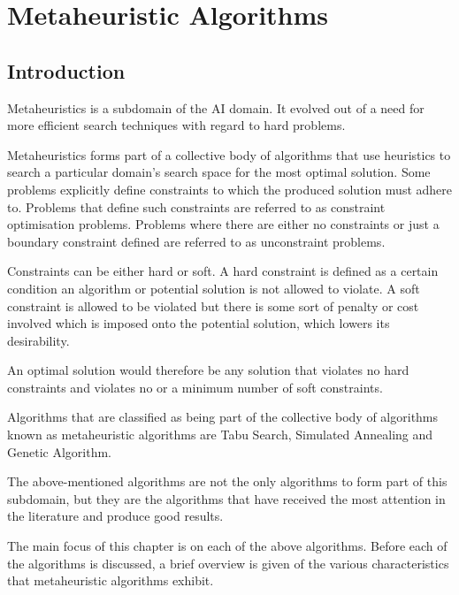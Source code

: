 \chapter{Metaheuristic Algorithms}
\label{chpt:heuristic}
\section{Introduction}
Metaheuristics is a subdomain of the \gls{AI} domain\cite{AIModernApproach}. It evolved out of a need for more efficient search techniques with regard to hard problems. 

Metaheuristics forms part of a collective body of algorithms that use heuristics to search a particular domain's search space for the most optimal solution\cite{AIModernApproach,NatureInspiredMetaHeuristic}. Some problems explicitly define constraints to which the produced solution must adhere to. Problems that define such constraints are referred to as constraint optimisation problems\cite{FundamentalSwarm}. Problems where there are either no constraints or just a boundary constraint  defined are referred to as unconstraint problems\cite{FundamentalSwarm}.

Constraints can be either hard or soft. A hard constraint is defined as a certain condition an algorithm or potential solution is not allowed to violate\cite{AIModernApproach,NatureInspiredMetaHeuristic,Karen2004,Eisenblatter}. A soft constraint is allowed to be violated but there is some sort of penalty or cost involved which is imposed onto the potential solution, which lowers its desirability\cite{AIModernApproach,NatureInspiredMetaHeuristic,Karen2004,Eisenblatter}. 

An optimal solution would therefore be any solution that violates no hard constraints and violates no or a minimum number of soft constraints\cite{AIModernApproach,NatureInspiredMetaHeuristic,Karen2004,Eisenblatter}.

Algorithms that are classified as being part of the collective body of algorithms known as metaheuristic algorithms are Tabu Search\cite{TabuVechicleRoutingWithTimeWindows,TabuCSP}, Simulated Annealing \cite{SASingleMultiObj,CurveFittingSA} and Genetic Algorithm\cite{GATSP, GeostatisticalGA}.

The above-mentioned algorithms are not the only algorithms to form part of this subdomain, but they are the algorithms that have received the most attention in the literature and produce good results\cite{SweepMeta}.

The main focus of this chapter is on each of the above algorithms. Before each of the algorithms is discussed, a brief overview is given of the various characteristics that metaheuristic algorithms exhibit. 

